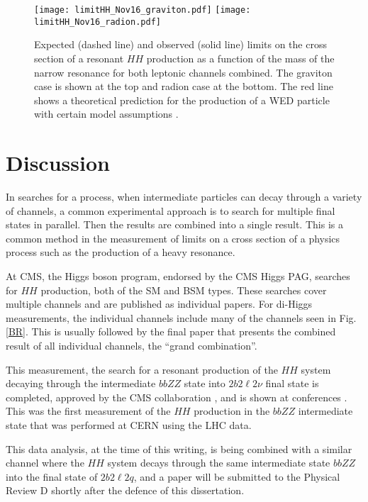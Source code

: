 \begin{figure}[H] 
\begin{center}
\texttt{[image: limitHH\_Nov16\_graviton.pdf]}
\texttt{[image: limitHH\_Nov16\_radion.pdf]}
\caption{ Expected (dashed line) and observed (solid line) limits on the cross section of a resonant $HH$ production
as a function of the mass of the narrow resonance for both leptonic channels combined. The graviton case is shown at the top and radion case at the bottom. The red line shows a theoretical prediction for
the production of a WED particle with certain model assumptions \cite{Oliveira:2014kla}.}
\label{fig:HHlimits} 
\end{center}
\end{figure}

\section{Discussion}
\label{sec:Discussion}

In searches for a process, when intermediate particles can decay through a variety of channels, a common experimental approach is to search for multiple final states in parallel. Then the results are combined into a single result. This is a common method in the measurement of limits on a cross section of a physics process such as the production of a heavy resonance.

At CMS, the Higgs boson program, endorsed by the CMS Higgs PAG, searches for $HH$ production, both of the SM and BSM types. These searches cover multiple channels and are published as individual papers. For di-Higgs measurements, the individual channels include many of the channels seen in Fig. \ref{BR}. This is usually followed by the final paper that presents the combined result of all individual channels, the ``grand combination''.

This measurement, the search for a resonant production of the $HH$ system decaying through the intermediate $bbZZ$ state into $2 b 2 \ell 2 \nu$ final state is completed, approved by the CMS collaboration \cite{CMS-PAS-HIG-17-032}, and is shown at conferences \cite{HiggsCouplings2018}. This was the first measurement of the $HH$ production in the $bbZZ$ intermediate state that was performed at CERN using the LHC data. 

This data analysis, at the time of this writing, is being combined with a similar channel where the $HH$ system decays through the same intermediate state $bbZZ$ into the final state of $2 b 2 \ell 2 q$, and a paper will be submitted to the Physical Review D shortly after the defence of this dissertation.

